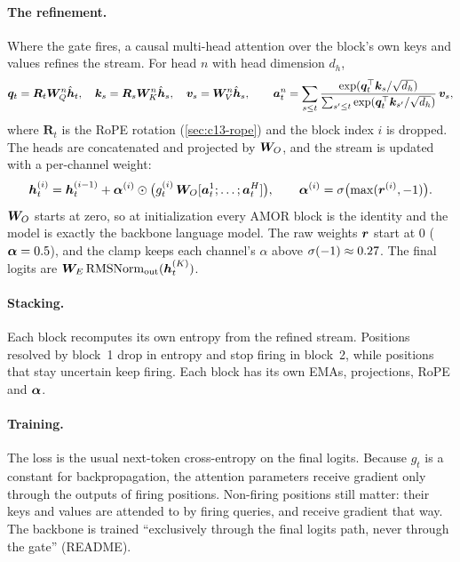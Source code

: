 \paragraph{The refinement.} Where the gate fires, a causal multi-head attention over the block's own
keys and values refines the stream. For head $n$ with head dimension $d_h$,
\begin{equation}\label{eq:c13-amor-attn}
  \bm{q}_t = \bm{R}_t\bm{W}_Q^{n}\hat{\bm{h}}_t,\quad \bm{k}_s = \bm{R}_s\bm{W}_K^{n}\hat{\bm{h}}_s,\quad \bm{v}_s=\bm{W}_V^{n}\hat{\bm{h}}_s,\qquad
  \bm{a}^{n}_t = \sum_{s\le t}\frac{\exp(\bm{q}_t^{\top}\bm{k}_s/\sqrt{d_h})}{\sum_{s'\le t}\exp(\bm{q}_t^{\top}\bm{k}_{s'}/\sqrt{d_h})}\,\bm{v}_s,
\end{equation}
where $\bm{R}_t$ is the RoPE rotation (\cref{sec:c13-rope}) and the block index $i$ is dropped. The heads
are concatenated and projected by $\bm{W}_O$, and the stream is updated with a per-channel weight:
\begin{equation}\label{eq:c13-amor-update}
  \bm{h}^{(i)}_t = \bm{h}^{(i-1)}_t + \bm{\alpha}^{(i)}\odot\bigl(g^{(i)}_t\,\bm{W}_O[\bm{a}^1_t;\dots;\bm{a}^{H}_t]\bigr),
  \qquad \bm{\alpha}^{(i)}=\sigma\bigl(\max(\bm{r}^{(i)},-1)\bigr).
\end{equation}
$\bm{W}_O$ starts at zero, so at initialization every AMOR block is the identity and the model is
exactly the backbone language model. The raw weights $\bm{r}$ start at $0$ ($\bm{\alpha}=0.5$), and the clamp
keeps each channel's $\alpha$ above $\sigma(-1)\approx 0.27$. The final logits are
$\bm{W}_E\operatorname{RMSNorm}_{\text{out}}(\bm{h}^{(K)}_t)$.

\paragraph{Stacking.} Each block recomputes its own entropy from the refined stream. Positions
resolved by block~1 drop in entropy and stop firing in block~2, while positions that stay uncertain
keep firing. Each block has its own EMAs, projections, RoPE and $\bm{\alpha}$.

\paragraph{Training.} The loss is the usual next-token cross-entropy on the final logits. Because
$g_t$ is a constant for backpropagation, the attention parameters receive gradient only through the
outputs of firing positions. Non-firing positions still matter: their keys and values are attended
to by firing queries, and receive gradient that way. The backbone is trained ``exclusively through the
final logits path, never through the gate'' (README).

